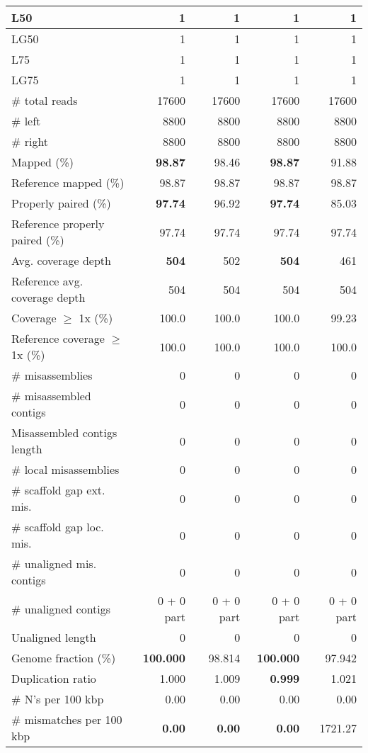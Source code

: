 \documentclass[12pt,a4paper]{article}
\begin{document}
\begin{table}[ht]
\begin{center}
\begin{tabular}{|l*{4}{|r}|}
L50 & 1 & 1 & 1 & 1 \\ \hline
LG50 & 1 & 1 & 1 & 1 \\ \hline
L75 & 1 & 1 & 1 & 1 \\ \hline
LG75 & 1 & 1 & 1 & 1 \\ \hline
\# total reads & 17600 & 17600 & 17600 & 17600 \\ \hline
\# left & 8800 & 8800 & 8800 & 8800 \\ \hline
\# right & 8800 & 8800 & 8800 & 8800 \\ \hline
Mapped (\%) & {\bf 98.87} & 98.46 & {\bf 98.87} & 91.88 \\ \hline
Reference mapped (\%) & 98.87 & 98.87 & 98.87 & 98.87 \\ \hline
Properly paired (\%) & {\bf 97.74} & 96.92 & {\bf 97.74} & 85.03 \\ \hline
Reference properly paired (\%) & 97.74 & 97.74 & 97.74 & 97.74 \\ \hline
Avg. coverage depth & {\bf 504} & 502 & {\bf 504} & 461 \\ \hline
Reference avg. coverage depth & 504 & 504 & 504 & 504 \\ \hline
Coverage $\geq$ 1x (\%) & 100.0 & 100.0 & 100.0 & 99.23 \\ \hline
Reference coverage $\geq$ 1x (\%) & 100.0 & 100.0 & 100.0 & 100.0 \\ \hline
\# misassemblies & 0 & 0 & 0 & 0 \\ \hline
\# misassembled contigs & 0 & 0 & 0 & 0 \\ \hline
Misassembled contigs length & 0 & 0 & 0 & 0 \\ \hline
\# local misassemblies & 0 & 0 & 0 & 0 \\ \hline
\# scaffold gap ext. mis. & 0 & 0 & 0 & 0 \\ \hline
\# scaffold gap loc. mis. & 0 & 0 & 0 & 0 \\ \hline
\# unaligned mis. contigs & 0 & 0 & 0 & 0 \\ \hline
\# unaligned contigs & 0 + 0 part & 0 + 0 part & 0 + 0 part & 0 + 0 part \\ \hline
Unaligned length & 0 & 0 & 0 & 0 \\ \hline
Genome fraction (\%) & {\bf 100.000} & 98.814 & {\bf 100.000} & 97.942 \\ \hline
Duplication ratio & 1.000 & 1.009 & {\bf 0.999} & 1.021 \\ \hline
\# N's per 100 kbp & 0.00 & 0.00 & 0.00 & 0.00 \\ \hline
\# mismatches per 100 kbp & {\bf 0.00} & {\bf 0.00} & {\bf 0.00} & 1721.27 \\ \hline

\end{tabular}
\end{center}
\end{table}
\end{document}
